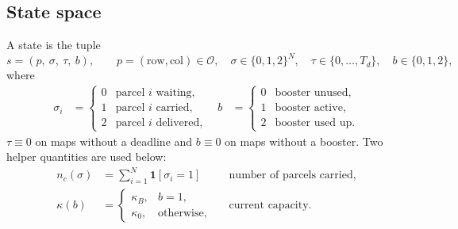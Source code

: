 \documentclass[11pt]{article}
\newcommand{\Open}{\mathcal{O}}
\newcommand{\ind}[1]{\mathbf{1}\!\left[#1\right]}
\begin{document}
\subsection{State space}
A state is the tuple
\begin{equation}
s=(p,\ \sigma,\ \tau,\ b),\qquad p=(\mathrm{row},\mathrm{col})\in\Open,\quad
\sigma\in\{0,1,2\}^{N},\quad \tau\in\{0,\dots,T_d\},\quad b\in\{0,1,2\},
\end{equation}
where
\begin{align}
\sigma_i &= \begin{cases}0 & \text{parcel $i$ waiting},\\ 1 & \text{parcel $i$ carried},\\ 2 & \text{parcel $i$ delivered},\end{cases} &
b &= \begin{cases}0 & \text{booster unused},\\ 1 & \text{booster active},\\ 2 & \text{booster used up}.\end{cases}
\end{align}
$\tau\equiv 0$ on maps without a deadline and $b\equiv 0$ on maps without a booster. Two helper quantities are used below:
\begin{align}
n_c(\sigma) &= \sum_{i=1}^{N}\ind{\sigma_i=1} && \text{number of parcels carried},\\
\kappa(b) &= \begin{cases}\kappa_B, & b=1,\\ \kappa_0, & \text{otherwise},\end{cases} && \text{current capacity}.
\end{align}
\end{document}
